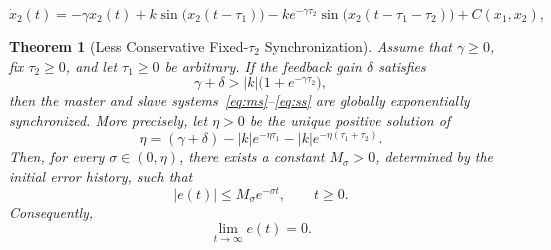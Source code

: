\documentclass[10pt,a4paper]{amsart}
\newtheorem{theorem}{Theorem}
\begin{document}
\begin{equation}
	\dot{x}_2(t)
	= -\gamma x_2(t)
	+ k\sin\big(x_2(t - \tau_1)\big)
	- k e^{-\gamma \tau_2}\sin\big(x_2(t - \tau_1 - \tau_2)\big)
	+ C(x_1,x_2),
	\label{eq:ss}
\end{equation}

\begin{theorem}[Less Conservative Fixed-$\tau_2$ Synchronization]
\label{thm:fixed_tau2_sync}
Assume that $\gamma\geq0$, fix $\tau_2\geq0$, and let $\tau_1\geq0$ be arbitrary. If the feedback gain $\delta$ satisfies
\begin{equation}
\gamma+\delta>|k|\bigl(1+e^{-\gamma\tau_2}\bigr),
\label{eq:less_conservative_sync}
\end{equation}
then the master and slave systems~\eqref{eq:ms}--\eqref{eq:ss} are globally exponentially synchronized. More precisely, let $\eta>0$ be the unique positive solution of
\begin{equation}
\eta
=
(\gamma+\delta)
-|k|e^{-\eta\tau_1}
-|k|e^{-\eta(\tau_1+\tau_2)}.
\label{eq:fixed_tau2_rate}
\end{equation}
Then, for every $\sigma\in(0,\eta)$, there exists a constant $M_\sigma>0$, determined by the initial error history, such that
\begin{equation}
|e(t)|\leq M_\sigma e^{-\sigma t},
\qquad t\geq0.
\label{eq:fixed_tau2_decay}
\end{equation}
Consequently,
\[
\lim_{t\to\infty}e(t)=0.
\]
\end{theorem}
\end{document}
